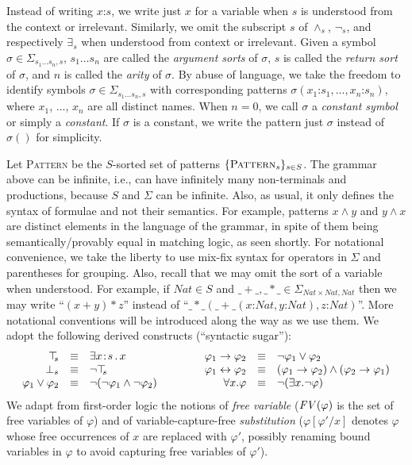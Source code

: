 \documentclass[UTF8,11pt]{article}
\theoremstyle{plain}
\theoremstyle{definition}
\theoremstyle{remark}
\newcommand{\cln}{\texttt{:}}
\newcommand{\Nat}{\textit{Nat}}
\newcommand{\Pattern}{\textsc{Pattern}\xspace}
\newcommand{\ra}{\rightarrow}
\newcommand{\lra}{\leftrightarrow}
\newcommand{\FV}{{\it FV}}
\begin{document}
Instead of writing $x \cln s$, we write just $x$ for a variable when $s$ is 
understood from the context or irrelevant.
Similarly, we omit the subscript $s$ of $\wedge_s$, $\neg_s$, and respectively
$\exists_s$ when understood from context or irrelevant.
Given a symbol $\sigma \in \Sigma_{s_1 \ldots s_n,s}$, $s_1 \ldots s_n$ are 
called the \emph{argument sorts} of $\sigma$, $s$ is called the 
\emph{return sort} of $\sigma$, and $n$ is called the \emph{arity} of
$\sigma$.
By abuse of language, we take the freedom to identify symbols
$\sigma\in\Sigma_{s_1 \ldots s_n,s}$ with corresponding patterns
$\sigma(x_1\cln s_1,...,x_n\cln s_n)$, where $x_1$, ..., $x_n$ are all
distinct names.
When $n = 0$, we call $\sigma$ a \emph{constant symbol} or simply a 
\emph{constant}.
If $\sigma$ is a constant, we write the pattern just $\sigma$ instead of 
$\sigma()$ for 
simplicity.

Let \Pattern be the $S$-sorted set of patterns $\{\Pattern_s\}_{s\in S}$.
The grammar above can be infinite, i.e., can have infinitely many
non-terminals and productions, because $S$ and $\Sigma$ can be
infinite.
Also, as usual, it only defines the syntax of formulae and not
their semantics.
For example, patterns $x \wedge y$ and $y \wedge x$ are distinct elements in
the language of the grammar, in spite of them being semantically/provably
equal in matching logic, as seen shortly.
For notational convenience, we take the liberty to use mix-fix syntax for
operators in $\Sigma$ and parentheses for grouping.
Also, recall that we may omit the sort of a variable when understood.
For example, if $\Nat \in S$ and
$\_+\_, \_*\_ \in \Sigma_{\Nat \times \Nat, \Nat}$
then we may write ``$(x + y)*z$'' instead of
``$\_*\_(\_+\_(x\cln\Nat,y\cln\Nat),z\cln\Nat)$''.
More notational conventions will be introduced along the way
as we use them. 
We adopt the following derived constructs (``syntactic sugar''): %
$$\begin{array}{rcl@{\hspace*{10ex}}rcl}
\top_{\!\!s} & \equiv & \exists x\!:\!s \,.\, x &
\varphi_1 \ra \varphi_2 & \equiv & \neg\varphi_1 \vee \varphi_2 \\
\bot_{s} & \equiv & \neg \top_{\!\!s} &
\varphi_1 \lra \varphi_2 & \equiv & (\varphi_1 \ra \varphi_2) \wedge
 (\varphi_2 \ra \varphi_1) \\
\varphi_1 \vee \varphi_2 & \equiv & \neg(\neg\varphi_1\wedge\neg\varphi_2) &
\forall x . \varphi & \equiv & \neg(\exists x . \neg\varphi) \\
\end{array}
$$
We adapt from first-order logic the notions of \emph{free variable}
($\FV(\varphi)$ is the set of free variables of $\varphi$) and of
variable-capture-free \emph{substitution} ($\varphi[\varphi'/x]$ denotes
$\varphi$ whose free occurrences of $x$ are replaced with $\varphi'$, possibly
renaming bound variables in $\varphi$ to avoid capturing free variables of
$\varphi'$).
\end{document}
